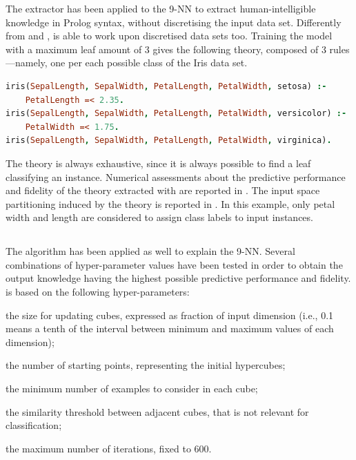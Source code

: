 \documentclass[
]{ceurart}
\begin{document}


The \cart{} extractor has been applied to the 9-NN to extract human-intelligible knowledge in Prolog syntax, without discretising the input data set.
%
Differently from \iter{} and \gridex{}, \cart{} is able to work upon discretised data sets too.
%
Training the model with a maximum leaf amount of 3 gives the following theory, composed of 3 rules---namely, one per each possible class of the Iris data set.

\begin{lstlisting}[language=Prolog]
iris(SepalLength, SepalWidth, PetalLength, PetalWidth, setosa) :-
    PetalLength =< 2.35.
iris(SepalLength, SepalWidth, PetalLength, PetalWidth, versicolor) :-
    PetalWidth =< 1.75.
iris(SepalLength, SepalWidth, PetalLength, PetalWidth, virginica).
\end{lstlisting}

The theory is always exhaustive, since it is always possible to find a leaf classifying an instance.
%
Numerical assessments about the predictive performance and fidelity of the theory extracted with \cart{} are reported in .
%
The input space partitioning induced by the theory is reported in .
%
In this example, only petal width and length are considered to assign class labels to input instances.

\subsection{\iter{}}



The \iter{} algorithm has been applied as well to explain the 9-NN.
%
Several combinations of hyper-parameter values have been tested in order to obtain the output knowledge having the highest possible predictive performance and fidelity.
%
\iter{} is based on the following hyper-parameters:
%
\begin{inlinelist}
	\item the size for updating cubes, expressed as fraction of input dimension (i.e., 0.1 means a tenth of the interval between minimum and maximum values of each dimension);
	\item the number of starting points, representing the initial hypercubes;
	\item the minimum number of examples to consider in each cube;
	\item the similarity threshold between adjacent cubes, that is not relevant for classification;
	\item the maximum number of iterations, fixed to 600.
\end{inlinelist}
\end{document}
